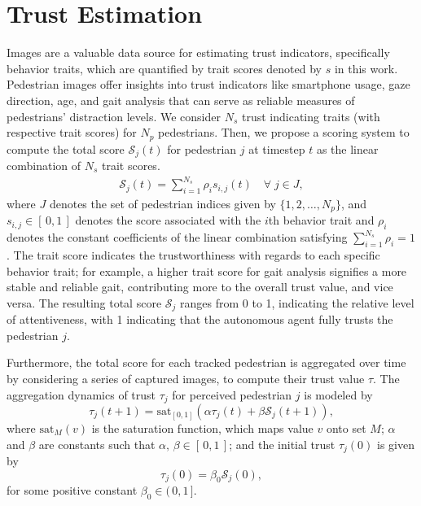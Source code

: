 \documentclass[journal]{IEEEtran}
\begin{document}
\section{Trust Estimation}
\label{section-trust}
Images are a valuable data source for estimating trust indicators, specifically behavior traits, which are quantified by trait scores denoted by $s$ in this work. Pedestrian images offer insights into trust indicators like smartphone usage, gaze direction, age, and gait analysis that can serve as reliable measures of pedestrians' distraction levels. We consider $N_s$ trust indicating traits (with respective trait scores) for $N_p$ pedestrians. Then, we propose a scoring system to compute the total score $\mathcal{S}_j(t)$ for pedestrian $j$ at timestep $t$ as the linear combination of $N_s$ trait scores.
\begin{align}
    \mathcal{S}_j(t) = \sum_{i=1}^{N_s}\rho_i s_{i, j}(t) \quad \forall \; j \in J,
\label{lin_comb}
\end{align}
where $J$ denotes the set of pedestrian indices given by $\{1,2,\hdots,N_p\}$, and $s_{i, j} \in [\,0, 1\,]$ denotes the score associated with the $i$th behavior trait and $\rho_i$ denotes the constant coefficients of the linear combination satisfying $\sum_{i=1}^{N_s}\rho_i = 1$.
The trait score indicates the trustworthiness with regards to each specific behavior trait; for example, a higher trait score for gait analysis signifies a more stable and reliable gait, contributing more to the overall trust value, and vice versa.
The resulting total score $\mathcal{S}_j$ ranges from 0 to 1, indicating the relative level of attentiveness, with  1 indicating that the autonomous agent fully trusts the pedestrian $j$.

Furthermore, the total score for each tracked pedestrian is aggregated over time by considering a series of captured images, to compute their trust value $\tau$. The aggregation dynamics of trust $\tau_j$ for perceived pedestrian $j$ is modeled by 
\begin{equation}
\tau_j(t+1) = \mbox{sat}_{[0,1]}(\alpha\tau_j(t) + \beta\mathcal{S}_j(t + 1)),
\label{agg_trust}
\end{equation}
where $\mbox{sat}_{M}(v)$ is the saturation function, which maps value $v$ onto set $M$; $\alpha$ and $\beta$ are constants such that $\alpha,\, \beta \in [\,0, 1\,]$; and the initial trust $\tau_j(0)$ is given by
\begin{equation}
\tau_j(0) = \beta_0\mathcal{S}_j(0), \nonumber
\end{equation}
for some positive constant $\beta_0 \in (\,0, 1\,]$.
\end{document}
